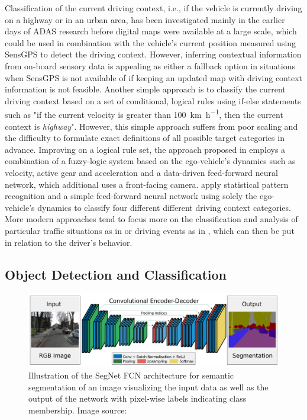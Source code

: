 Classification of the current driving context, i.e., if the vehicle is currently driving on a highway or in an urban area, has been investigated mainly in the earlier days of \ac{ADAS} research before digital maps were available at a large scale, which could be used in combination with the vehicle's current position measured using \ac{SensGPS} to detect the driving context.
However, inferring contextual information from on-board sensory data is appealing as either a fallback option in situations when \ac{SensGPS} is not available of if keeping an updated map with driving context information is not feasible.
Another simple approach is to classify the current driving context based on a set of conditional, logical rules using if-else statements such as "if the current velocity is greater than \SI{100}{\kilo\meter\per\hour}, then the current context is \emph{highway}".
However, this simple approach suffers from poor scaling and the difficulty to formulate exact definitions of all possible target categories in advance.
Improving on a logical rule set, the approach proposed in \textcite{Hauptmann1996} employs a combination of a fuzzy-logic system based on the ego-vehicle's dynamics such as velocity, active gear and acceleration and a data-driven feed-forward neural network, which additional uses a front-facing camera.
\textcite{Engstrom2001} apply statistical pattern recognition and a simple feed-forward neural network using solely the ego-vehicle's dynamics to classify four different different driving context categories.
More modern approaches tend to focus more on the classification and analysis of particular traffic situations  as in \textcite{Hermann2008} or driving events as in \textcite{Dagostino2013}, which can then be put in relation to the driver's behavior.

\subsection{Object Detection and Classification}
\label{subsec:obj_detect}

\begin{figure}[t!]
    \centering
    \includegraphics[width=0.95\linewidth]{imgs/segnet.png}
    \caption{Illustration of the SegNet \ac{FCN} architecture for semantic segmentation of an image visualizing the input data as well as the output of the network with pixel-wise labels indicating class membership. Image source: \textcite{Badrinarayanan2015}}
    \label{fig:segnet_achitecture}
\end{figure}

